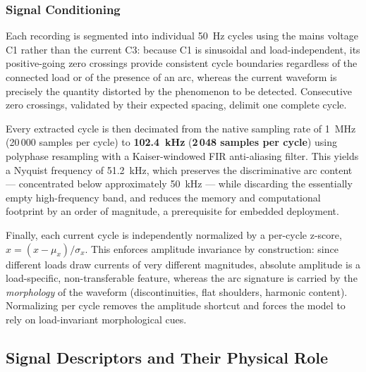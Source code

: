 \documentclass[journal,article,submit,moreauthors]{Definitions/mdpi}
\begin{document}
\subsubsection{Signal Conditioning}
\label{sec:signal_conditioning}

Each recording is segmented into individual 50~Hz cycles using the mains voltage C1 rather than the current C3: because C1 is sinusoidal and load-independent, its positive-going zero crossings provide consistent cycle boundaries regardless of the connected load or of the presence of an arc, whereas the current waveform is precisely the quantity distorted by the phenomenon to be detected. Consecutive zero crossings, validated by their expected spacing, delimit one complete cycle.

Every extracted cycle is then decimated from the native sampling rate of 1~MHz (20\,000 samples per cycle) to \textbf{102.4~kHz} (\textbf{2\,048 samples per cycle}) using polyphase resampling with a Kaiser-windowed FIR anti-aliasing filter. This yields a Nyquist frequency of 51.2~kHz, which preserves the discriminative arc content --- concentrated below approximately 50~kHz --- while discarding the essentially empty high-frequency band, and reduces the memory and computational footprint by an order of magnitude, a prerequisite for embedded deployment.

Finally, each current cycle is independently normalized by a per-cycle z-score, $\hat{x} = (x - \mu_x)/\sigma_x$. This enforces amplitude invariance by construction: since different loads draw currents of very different magnitudes, absolute amplitude is a load-specific, non-transferable feature, whereas the arc signature is carried by the \emph{morphology} of the waveform (discontinuities, flat shoulders, harmonic content). Normalizing per cycle removes the amplitude shortcut and forces the model to rely on load-invariant morphological cues.

\subsection{Signal Descriptors and Their Physical Role}
\label{sec:descriptors}
\end{document}
